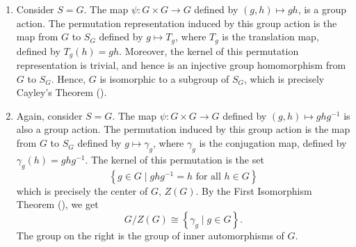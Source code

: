 \begin{exe}
    \phantom{hi}
    \begin{enumerate}
        \item Consider $S = G$. The map $\psi \colon G \times G \to G$ defined by $(g,h) \mapsto gh$, is a group action. The permutation representation induced by this group action is the map from $G$ to $S_G$ defined by $g \mapsto T_g$, where $T_g$ is the translation map, defined by $T_g(h) = gh$. Moreover, the kernel of this permutation representation is trivial, and hence is an injective group homomorphism from $G$ to $S_G$. Hence, $G$ is isomorphic to a subgroup of $S_G$, which is precisely Cayley's Theorem ().
        
        \item Again, consider $S = G$. The map $\psi \colon G \times G \to G$ defined by $(g,h) \mapsto ghg^{-1}$ is also a group action. The permutation induced by this group action is the map from $G$ to $S_G$ defined by $g \mapsto \gamma_g$, where $\gamma_g$ is the conjugation map, defined by $\gamma_g(h) = ghg^{-1}$. The kernel of this permutation is the set 
        \[
            \left\{ g \in G \mid ghg^{-1} = h \text{ for all } h \in G \right\}
        \]
        which is precisely the center of $G$, $Z(G)$. By the First Isomorphism Theorem (), we get
        \[
            G/Z(G) \cong \left\{ \gamma_g \mid g \in G \right\}.
        \]
        The group on the right is the group of inner automorphisms of $G$.
        

\end{enumerate}
\end{exe}
